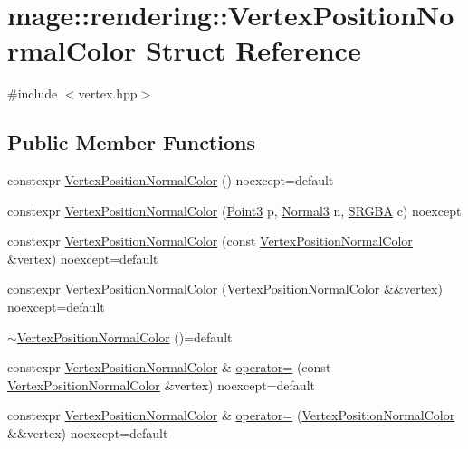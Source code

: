 \hypertarget{structmage_1_1rendering_1_1_vertex_position_normal_color}{}\section{mage\+:\+:rendering\+:\+:Vertex\+Position\+Normal\+Color Struct Reference}
\label{structmage_1_1rendering_1_1_vertex_position_normal_color}


{\ttfamily \#include $<$vertex.\+hpp$>$}

\subsection*{Public Member Functions}
\begin{DoxyCompactItemize}
\item 
constexpr \hyperlink{structmage_1_1rendering_1_1_vertex_position_normal_color_af43537af55a5ed53f4828b5e7ea0f5c2}{Vertex\+Position\+Normal\+Color} () noexcept=default
\item 
constexpr \hyperlink{structmage_1_1rendering_1_1_vertex_position_normal_color_a021431bf902ccd7b4aa0e2864bf54814}{Vertex\+Position\+Normal\+Color} (\hyperlink{structmage_1_1_point3}{Point3} p, \hyperlink{structmage_1_1_normal3}{Normal3} n, \hyperlink{structmage_1_1_s_r_g_b_a}{S\+R\+G\+BA} c) noexcept
\item 
constexpr \hyperlink{structmage_1_1rendering_1_1_vertex_position_normal_color_ae5112aeadb68fc216e58168600417e31}{Vertex\+Position\+Normal\+Color} (const \hyperlink{structmage_1_1rendering_1_1_vertex_position_normal_color}{Vertex\+Position\+Normal\+Color} \&vertex) noexcept=default
\item 
constexpr \hyperlink{structmage_1_1rendering_1_1_vertex_position_normal_color_ac6247b996c107e6daa2204f98d38b2a9}{Vertex\+Position\+Normal\+Color} (\hyperlink{structmage_1_1rendering_1_1_vertex_position_normal_color}{Vertex\+Position\+Normal\+Color} \&\&vertex) noexcept=default
\item 
\hyperlink{structmage_1_1rendering_1_1_vertex_position_normal_color_af78e3787e0971664a9114cdf4335101c}{$\sim$\+Vertex\+Position\+Normal\+Color} ()=default
\item 
constexpr \hyperlink{structmage_1_1rendering_1_1_vertex_position_normal_color}{Vertex\+Position\+Normal\+Color} \& \hyperlink{structmage_1_1rendering_1_1_vertex_position_normal_color_ae3bdf697f0dae8b01b43c6a8249ee817}{operator=} (const \hyperlink{structmage_1_1rendering_1_1_vertex_position_normal_color}{Vertex\+Position\+Normal\+Color} \&vertex) noexcept=default
\item 
constexpr \hyperlink{structmage_1_1rendering_1_1_vertex_position_normal_color}{Vertex\+Position\+Normal\+Color} \& \hyperlink{structmage_1_1rendering_1_1_vertex_position_normal_color_a2528c797701a7102e6895d5c5d04cf27}{operator=} (\hyperlink{structmage_1_1rendering_1_1_vertex_position_normal_color}{Vertex\+Position\+Normal\+Color} \&\&vertex) noexcept=default
\end{DoxyCompactItemize}
